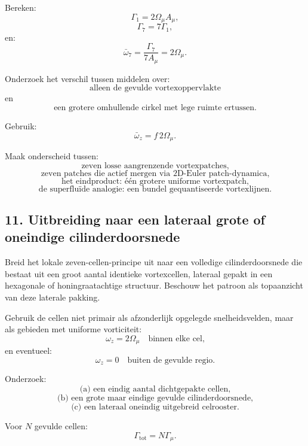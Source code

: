 \documentclass[11pt]{article}
\begin{document}
        Bereken:
        \[
            \Gamma_1=2\Omega_{\mu}A_{\mu},
        \]
        \[
            \Gamma_7=7\Gamma_1,
        \]
        en:
        \[
            \bar{\omega}_7
            =
            \frac{\Gamma_7}{7A_{\mu}}
            =
            2\Omega_{\mu}.
        \]
        
        Onderzoek het verschil tussen middelen over:
        \[
            \text{alleen de gevulde vortexoppervlakte}
        \]
        en
        \[
            \text{een grotere omhullende cirkel met lege ruimte ertussen.}
        \]
        
        Gebruik:
        \[
            \bar{\omega}_z=f\,2\Omega_{\mu}.
        \]
        
        Maak onderscheid tussen:
        \[
            \text{zeven losse aangrenzende vortexpatches,}
        \]
        \[
            \text{zeven patches die actief mergen via 2D-Euler patch-dynamica,}
        \]
        \[
            \text{het eindproduct: één grotere uniforme vortexpatch,}
        \]
        \[
            \text{de superfluïde analogie: een bundel gequantiseerde vortexlijnen.}
        \]
    
    \subsection{11. Uitbreiding naar een lateraal grote of oneindige cilinderdoorsnede}
        
        Breid het lokale zeven-cellen-principe uit naar een volledige cilinderdoorsnede die bestaat uit een groot aantal identieke vortexcellen, lateraal gepakt in een hexagonale of honingraatachtige structuur. Beschouw het patroon als topaanzicht van deze laterale pakking.
        
        Gebruik de cellen niet primair als afzonderlijk opgelegde snelheidsvelden, maar als gebieden met uniforme vorticiteit:
        \[
            \omega_z = 2\Omega_{\mu}
            \quad \text{binnen elke cel,}
        \]
        en eventueel:
        \[
            \omega_z = 0
            \quad \text{buiten de gevulde regio.}
        \]
        
        Onderzoek:
        \[
            \text{(a) een eindig aantal dichtgepakte cellen,}
        \]
        \[
            \text{(b) een grote maar eindige gevulde cilinderdoorsnede,}
        \]
        \[
            \text{(c) een lateraal oneindig uitgebreid celrooster.}
        \]
        
        Voor \(N\) gevulde cellen:
        \[
            \Gamma_{\mathrm{tot}}=N\Gamma_{\mu}.
        \]
        
\end{document}
